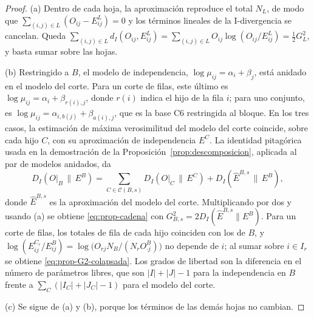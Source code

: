 \begin{proof}
(a) Dentro de cada hoja, la aproximación reproduce el total $N_L$, de modo que
$\sum_{(i,j)\in L}(O_{ij}-E^{L}_{ij}) = 0$ y los términos lineales de la
I-divergencia se cancelan. Queda
$\sum_{(i,j)\in L} d_I(O_{ij},E^L_{ij}) = \sum_{(i,j)\in L} O_{ij}\log(O_{ij}/E^L_{ij}) = \tfrac12 G^2_L$,
y basta sumar sobre las hojas.

(b) Restringido a $B$, el modelo de independencia,
$\log\mu_{ij} = \alpha_i + \beta_j$, está anidado en el modelo del corte. Para
un corte de filas, este último es $\log\mu_{ij} = \alpha_i + \beta_{r(i),j}$,
donde $r(i)$ indica el hijo de la fila $i$; para uno conjunto, es
$\log\mu_{ij} = \alpha_{i,b(j)} + \beta_{a(i),j}$, que es la base C6 restringida
al bloque. En los tres casos, la estimación de máxima verosimilitud del modelo
del corte coincide, sobre cada hijo $C$, con su aproximación de independencia
$E^{C}$. La identidad pitagórica usada en la demostración de la
Proposición~\ref{prop:descomposicion}, aplicada al par de modelos anidados,
da
\[
  D_I(O|_B \,\|\, E^{B})
  = \sum_{C\in\mathcal{C}(B,s)} D_I(O|_C \,\|\, E^{C})
  + D_I(\hat E^{B,s} \,\|\, E^{B}),
\]
donde $\hat E^{B,s}$ es la aproximación del modelo del corte. Multiplicando por
dos y usando (a) se obtiene \eqref{eq:prop-cadena} con
$G^2_{B,s} = 2D_I(\hat E^{B,s}\|E^B)$. Para un corte de filas, los totales de
fila de cada hijo coinciden con los de $B$, y
$\log(E^{C_r}_{ij}/E^{B}_{ij}) = \log\bigl(O_{rj}N_B/(N_r O^B_{\cdot j})\bigr)$
no depende de $i$; al sumar sobre $i\in I_r$ se obtiene
\eqref{eq:prop-G2-colapsada}. Los grados de libertad son la diferencia en el
número de parámetros libres, que son $|I|+|J|-1$ para la independencia en $B$ frente a
$\sum_C(|I_C|+|J_C|-1)$ para el modelo del corte.

(c) Se sigue de (a) y (b), porque los términos de las demás hojas no cambian.
\end{proof}

